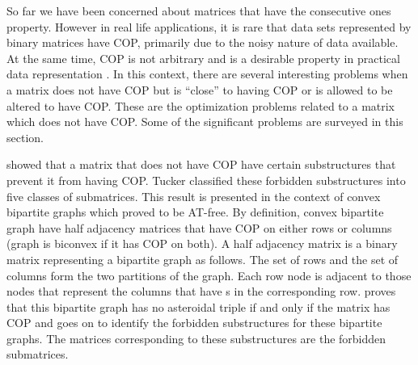 {So far we have been concerned about matrices that have the consecutive
ones property. However in real life applications, it is rare that data
sets represented by binary matrices have COP, primarily due to the
noisy nature of data available. At the same time, COP is not arbitrary
and is a desirable property in practical data representation
\cite{co98,jkckv04,k77}. In this context, there are several
interesting problems when a matrix does not have COP but is ``close''
to having COP or is allowed to be altered to have COP. These are the
optimization problems related to a matrix which does not have
COP. Some of the significant problems are surveyed in this section.

 \cite{at72} showed that a matrix that
does not have COP have certain substructures that prevent it from
having COP. Tucker classified these forbidden substructures into five
classes of submatrices. This result is presented in the context of
convex bipartite graphs which \cite{at72} proved to be
AT-free. By
definition, convex bipartite graph have half adjacency matrices that
have COP on either rows or columns (graph is biconvex if it has COP on
both)\cite{d08phd}. A half adjacency matrix is a binary matrix
representing a bipartite graph as follows. The set of rows and the set
of columns form the two partitions of the graph. Each row node is
adjacent to those nodes that represent the columns that have {\un}s in
the corresponding row. \cite{at72} proves that this bipartite graph
has no asteroidal triple if and only if the matrix has COP and goes on
to identify the forbidden substructures for these bipartite
graphs. The matrices corresponding to these substructures are the
forbidden submatrices.

}
